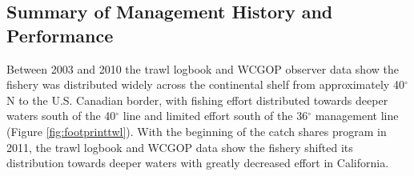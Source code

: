 \documentclass[11pt,
  english,
  a4paper,
]{article}
\begin{document}
\leavevmode\tagmcend\tagstructend\par


\hypertarget{summary-of-management-history-and-performance}{%
\subsection{Summary of Management History and Performance}\label{summary-of-management-history-and-performance}}

\leavevmode\tagmcend\tagstructend


Between 2003 and 2010 the trawl logbook and WCGOP observer data show the fishery was distributed widely across the continental shelf from approximately 40{\(^{\circ}\)\leavevmode\tagmcend\tagstructend}N to the U.S. Canadian border, with fishing effort distributed towards deeper waters south of the 40{\(^{\circ}\)\leavevmode\tagmcend\tagstructend} line and limited effort south of the 36{\(^{\circ}\)\leavevmode\tagmcend\tagstructend} management line (Figure \ref{fig:footprinttwl}). With the beginning of the catch shares program in 2011, the trawl logbook and WCGOP data show the fishery shifted its distribution towards deeper waters with greatly decreased effort in California.

\leavevmode\tagmcend\tagstructend\par
\end{document}
